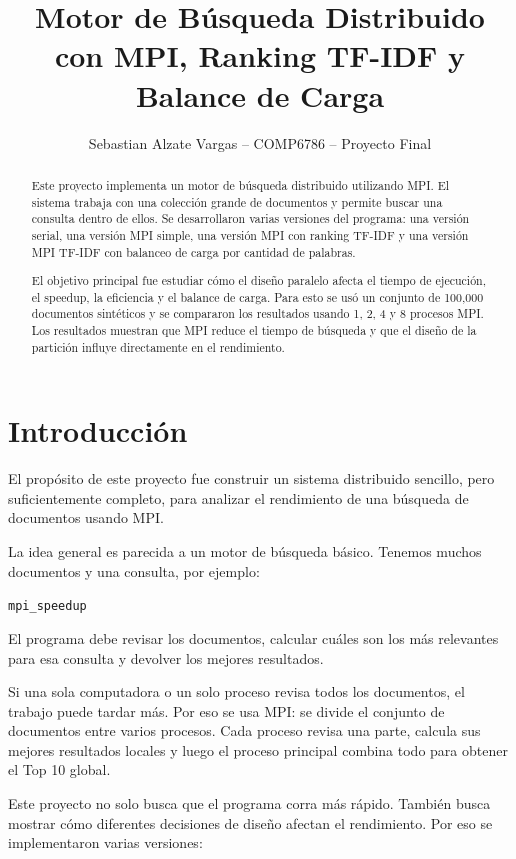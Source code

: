 \documentclass[12pt,letterpaper]{article}
\title{\textbf{Motor de Búsqueda Distribuido con MPI, Ranking TF-IDF y Balance de Carga}}
\author{Sebastian Alzate Vargas -- COMP6786 -- Proyecto Final}
\date{}
\begin{document}
\maketitle

\begin{abstract}
Este proyecto implementa un motor de búsqueda distribuido utilizando MPI. El sistema trabaja con una colección grande de documentos y permite buscar una consulta dentro de ellos. Se desarrollaron varias versiones del programa: una versión serial, una versión MPI simple, una versión MPI con ranking TF-IDF y una versión MPI TF-IDF con balanceo de carga por cantidad de palabras.

El objetivo principal fue estudiar cómo el diseño paralelo afecta el tiempo de ejecución, el speedup, la eficiencia y el balance de carga. Para esto se usó un conjunto de 100,000 documentos sintéticos y se compararon los resultados usando 1, 2, 4 y 8 procesos MPI. Los resultados muestran que MPI reduce el tiempo de búsqueda y que el diseño de la partición influye directamente en el rendimiento.
\end{abstract}

\section{Introducción}

El propósito de este proyecto fue construir un sistema distribuido sencillo, pero suficientemente completo, para analizar el rendimiento de una búsqueda de documentos usando MPI.

La idea general es parecida a un motor de búsqueda básico. Tenemos muchos documentos y una consulta, por ejemplo:

\begin{center}
\texttt{mpi\_speedup}
\end{center}

El programa debe revisar los documentos, calcular cuáles son los más relevantes para esa consulta y devolver los mejores resultados.

Si una sola computadora o un solo proceso revisa todos los documentos, el trabajo puede tardar más. Por eso se usa MPI: se divide el conjunto de documentos entre varios procesos. Cada proceso revisa una parte, calcula sus mejores resultados locales y luego el proceso principal combina todo para obtener el Top 10 global.

Este proyecto no solo busca que el programa corra más rápido. También busca mostrar cómo diferentes decisiones de diseño afectan el rendimiento. Por eso se implementaron varias versiones:
\end{document}
